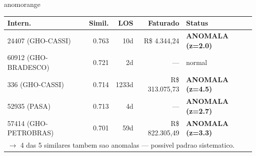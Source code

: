 \documentclass[a4paper,10pt]{article}
\begin{document}
\begin{anomalycard}[Internacao 261655 | GOHOSP-CNU | ALTO (z=3.74)]{anomorange}
\begin{tabular}{l r r r l}\toprule\textbf{Intern.} & \textbf{Simil.} & \textbf{LOS} & \textbf{Faturado} & \textbf{Status} \\\midrule
24407 (GHO-CASSI) & 0.763 & 10d & R\$ 4.344,24 & \textcolor{anomred}{\textbf{ANOMALA (z=2.0)}} \\
60912 (GHO-BRADESCO) & 0.721 & 2d & --- & \textcolor{jcubeblue}{normal} \\
336 (GHO-CASSI) & 0.714 & 1233d & R\$ 313.075,73 & \textcolor{anomred}{\textbf{ANOMALA (z=4.5)}} \\
52935 (PASA) & 0.713 & 4d & --- & \textcolor{anomred}{\textbf{ANOMALA (z=2.7)}} \\
57414 (GHO-PETROBRAS) & 0.701 & 59d & R\$ 822.305,49 & \textcolor{anomred}{\textbf{ANOMALA (z=3.3)}} \\
\multicolumn{5}{l}{\textcolor{anomred}{\small $\rightarrow$ 4 das 5 similares tambem sao anomalas --- possivel padrao sistematico.}} \\
\bottomrule\end{tabular}


\end{anomalycard}

\newpage
\end{document}
